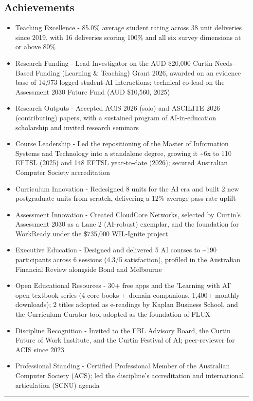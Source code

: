 \documentclass[11pt,a4paper]{article}
\begin{document}
\subsection*{Achievements}
\begin{itemize}
\item Teaching Excellence - 85.0\% average student rating across 38 unit deliveries since 2019, with 16 deliveries scoring 100\% and all six survey dimensions at or above 80\%
\item Research Funding - Lead Investigator on the AUD \$20,000 Curtin Needs-Based Funding (Learning \& Teaching) Grant 2026, awarded on an evidence base of 14,973 logged student-AI interactions; technical co-lead on the Assessment 2030 Future Fund (AUD \$10,560, 2025)
\item Research Outputs - Accepted ACIS 2026 (solo) and ASCILITE 2026 (contributing) papers, with a sustained program of AI-in-education scholarship and invited research seminars
\item Course Leadership - Led the repositioning of the Master of Information Systems and Technology into a standalone degree, growing it \textasciitilde{}6x to 110 EFTSL (2025) and 148 EFTSL year-to-date (2026); secured Australian Computer Society accreditation
\item Curriculum Innovation - Redesigned 8 units for the AI era and built 2 new postgraduate units from scratch, delivering a 12\% average pass-rate uplift
\item Assessment Innovation - Created CloudCore Networks, selected by Curtin's Assessment 2030 as a Lane 2 (AI-robust) exemplar, and the foundation for WorkReady under the \$735,000 WIL-Ignite project
\item Executive Education - Designed and delivered 5 AI courses to \textasciitilde{}190 participants across 6 sessions (4.3/5 satisfaction), profiled in the Australian Financial Review alongside Bond and Melbourne
\item Open Educational Resources - 30+ free apps and the 'Learning with AI' open-textbook series (4 core books + domain companions, 1,400+ monthly downloads); 2 titles adopted as e-readings by Kaplan Business School, and the Curriculum Curator tool adopted as the foundation of FLUX
\item Discipline Recognition - Invited to the FBL Advisory Board, the Curtin Future of Work Institute, and the Curtin Festival of AI; peer-reviewer for ACIS since 2023
\item Professional Standing - Certified Professional Member of the Australian Computer Society (ACS); led the discipline's accreditation and international articulation (SCNU) agenda
\end{itemize}
\vspace{4pt}\hrule\vspace{4pt}
\end{document}

